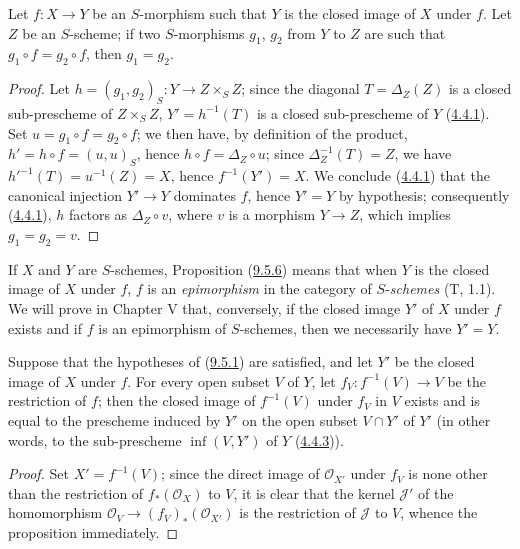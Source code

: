 \begin{corollary}[9.5.6]
\label{I.9.5.6}
Let $f:X\to Y$ be an $S$-morphism such that $Y$ is the closed image of $X$
under $f$. Let $Z$ be an $S$-scheme; if two $S$-morphisms $g_1$, $g_2$ from
$Y$ to $Z$ are such that $g_1\circ f=g_2\circ f$, then $g_1=g_2$.
\end{corollary}

\begin{proof}
Let $h=(g_1,g_2)_S:Y\to Z\times_S Z$; since the diagonal
$T=\Delta_Z(Z)$ is a closed sub-prescheme of $Z\times_S Z$,
$Y'=h^{-1}(T)$ is a closed sub-prescheme of $Y$
(\hyperref[I.4.4.1]{4.4.1}). Set $u=g_1\circ f=g_2\circ f$; we then
have, by definition of the product, $h'=h\circ f=(u,u)_S$, hence
$h\circ f=\Delta_Z\circ u$; since $\Delta_Z^{-1}(T)=Z$, we have
$h'^{-1}(T)=u^{-1}(Z)=X$, hence $f^{-1}(Y')=X$. We conclude
(\hyperref[I.4.4.1]{4.4.1}) that the canonical injection $Y'\to Y$
dominates $f$, hence $Y'=Y$ by hypothesis; consequently
(\hyperref[I.4.4.1]{4.4.1}), $h$ factors as $\Delta_Z\circ v$, where
$v$ is a morphism $Y\to Z$, which implies $g_1=g_2=v$.
\end{proof}

\begin{remark}[9.5.7]
\label{I.9.5.7}
If $X$ and $Y$ are $S$-schemes, Proposition
(\hyperref[I.9.5.6]{9.5.6}) means that
when $Y$ is the closed image of $X$ under $f$, $f$ is an
\emph{epimorphism} in the category of $S$-\emph{schemes} (T, 1.1). We will prove
in Chapter V that, conversely, if the closed image $Y'$ of $X$ under $f$
exists and if $f$ is an epimorphism of $S$-schemes, then we necessarily
have $Y'=Y$.
\end{remark}

\begin{proposition}[9.5.8]
\label{I.9.5.8}
Suppose that the hypotheses of \textup{(\hyperref[I.9.5.1]{9.5.1})} are satisfied,
and let $Y'$ be the closed image of $X$ under $f$. For every open subset $V$
of $Y$, let $f_V:f^{-1}(V)\to V$ be the restriction of $f$; then the closed
image of $f^{-1}(V)$ under $f_V$ in $V$ exists and is equal to the
prescheme induced by $Y'$ on the open subset $V\cap Y'$ of $Y'$ \textup{(in other
words, to the sub-prescheme $\inf(V,Y')$ of $Y$
\textup{(\hyperref[I.4.4.3]{4.4.3})})}.
\end{proposition}

\begin{proof}
Set $X'=f^{-1}(V)$; since the direct image of $\mathscr{O}_{X'}$ under
$f_V$ is none other than the restriction of $f_*(\mathscr{O}_X)$ to $V$, it
is clear that the kernel $\mathscr{J}'$ of the homomorphism
$\mathscr{O}_V\to(f_V)_*(\mathscr{O}_{X'})$ is the restriction of
$\mathscr{J}$ to $V$, whence the proposition immediately.
\end{proof}

